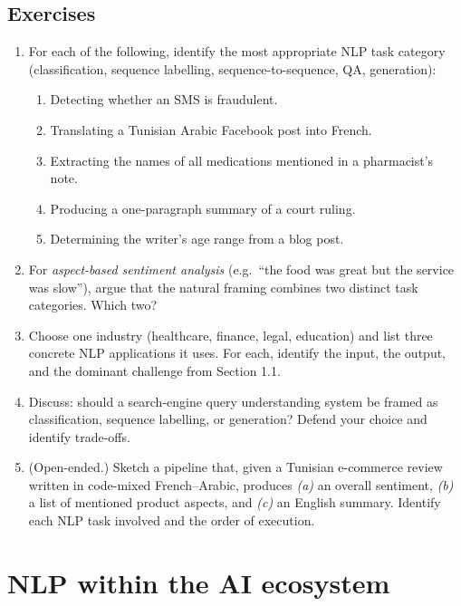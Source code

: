 \subsection{Exercises}
\begin{enumerate}
    \item For each of the following, identify the most appropriate NLP task category (classification, sequence labelling, sequence-to-sequence, QA, generation):
    \begin{enumerate}
        \item Detecting whether an SMS is fraudulent.
        \item Translating a Tunisian Arabic Facebook post into French.
        \item Extracting the names of all medications mentioned in a pharmacist's note.
        \item Producing a one-paragraph summary of a court ruling.
        \item Determining the writer's age range from a blog post.
    \end{enumerate}
    \item For \emph{aspect-based sentiment analysis} (e.g.\ ``the food was great but the service was slow''), argue that the natural framing combines two distinct task categories. Which two?
    \item Choose one industry (healthcare, finance, legal, education) and list three concrete NLP applications it uses. For each, identify the input, the output, and the dominant challenge from Section 1.1.
    \item Discuss: should a search-engine query understanding system be framed as classification, sequence labelling, or generation? Defend your choice and identify trade-offs.
    \item (Open-ended.) Sketch a pipeline that, given a Tunisian e-commerce review written in code-mixed French--Arabic, produces \emph{(a)} an overall sentiment, \emph{(b)} a list of mentioned product aspects, and \emph{(c)} an English summary. Identify each NLP task involved and the order of execution.
\end{enumerate}

\section{NLP within the AI ecosystem}

